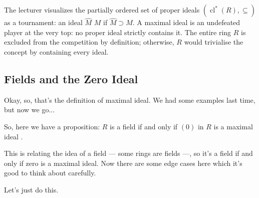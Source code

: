 \begin{insight}
The lecturer visualizes the partially ordered set of proper ideals $(\operatorname{cl}^*(R), \subseteq)$ as a tournament: an ideal $\hat{M}$  $M$ if $\hat{M} \supset M$. A maximal ideal is an undefeated player at the very top: no proper ideal strictly contains it. The entire ring $R$ is excluded from the competition by definition; otherwise, $R$ would trivialise the concept by containing every ideal.
\end{insight}

\subsection{Fields and the Zero Ideal}

\begin{speech}[00:12:36 - 00:13:28]
Okay, so, that's the definition of maximal ideal. We had some examples last time, but now we go...

So, here we have a proposition: $R$ is a field if and only if $(0)$ in $R$ is a maximal ideal .

This is relating the idea of a field --- some rings are fields ---, so it's a field if and only if zero is a maximal ideal. Now there are some edge cases here which it's good to think about carefully.

Let's just do this.
\end{speech}


\begin{content}
\end{content}

